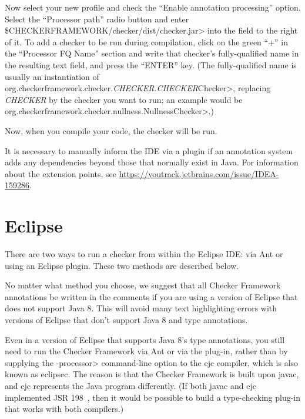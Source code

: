 \begin{enumerate}
  Now select your new profile and check the ``Enable annotation processing''
  option. Select the ``Processor path'' radio button and enter
  \<\$CHECKERFRAMEWORK/checker/dist/checker.jar> into the field to the right
  of it. To add a checker to be run during compilation, click on the green
  ``+'' in the ``Processor FQ Name'' section and write that checker's
  fully-qualified name in
  the resulting text field, and press the ``ENTER'' key.
  (The fully-qualified name is usually an instantiation of
  \<org.checkerframework.checker.\emph{CHECKER}.\emph{CHECKER}Checker>,
  replacing \emph{CHECKER} by the checker you
  want to run; an example would be
  \<org.checkerframework.checker.nullness.NullnessChecker>.)

\end{enumerate}

Now, when you compile your code, the checker will be run.

It is necessary to manually inform the IDE via a plugin if an annotation
system adds any dependencies beyond those that normally exist in Java.
For information about the extension points, see
\url{https://youtrack.jetbrains.com/issue/IDEA-159286}.

\section{Eclipse\label{eclipse}}


There are two ways to run a checker from within the Eclipse IDE:  via Ant
or using an Eclipse plugin.  These two methods are described below.

No matter what method you choose, we suggest that
all Checker Framework annotations be written in the comments
if you are using a version of Eclipse that
does not support Java 8.  This will avoid many
text highlighting errors with versions of Eclipse that don't support Java 8
and type annotations.

Even in a version of Eclipse that supports Java 8's type annotations, you
still need to run the Checker Framework via Ant or via the plug-in, rather
than by supplying the \<-processor> command-line option to the ejc
compiler, which is also known as eclipsec.
The reason is that the Checker Framework is built upon javac,
and ejc represents the Java program differently.  (If both javac and ejc
implemented JSR 198~\cite{JSR198}, then it would be possible to build
a type-checking plug-in that works with both compilers.)


